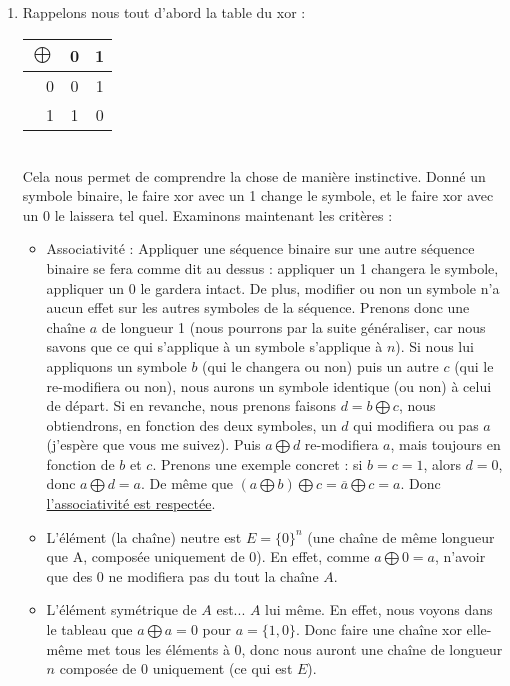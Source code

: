 \documentclass[10p,a4paper]{scrartcl}
\begin{document}
\subsection{}
\begin{enumerate}
	\item	Rappelons nous tout d'abord la table du xor :
			\begin{tabular}{r|cc}
				$\bigoplus$ & 0 & 1\\
				\hline
				0 & 0 & 1\\
				1 & 1 & 0
			\end{tabular}\\
			Cela nous permet de comprendre la chose de manière instinctive. Donné un symbole binaire, le faire xor avec un 1 change le symbole, et le faire xor avec un 0 le laissera tel quel.
			Examinons maintenant les critères :
			\begin{itemize}
				\item 	Associativité : Appliquer une séquence binaire sur une autre séquence binaire se fera comme dit au dessus : appliquer un 1 changera le symbole, appliquer un 0 le gardera intact. De plus, modifier ou non un symbole n'a aucun effet sur les autres symboles de la séquence. Prenons donc une chaîne $a$ de longueur 1 (nous pourrons par la suite généraliser, car nous savons que ce qui s'applique à un symbole s'applique à $n$). Si nous lui appliquons un symbole $b$ (qui le changera ou non) puis un autre $c$ (qui le re-modifiera ou non), nous aurons un symbole identique (ou non) à celui de départ. Si en revanche, nous prenons faisons $d = b\bigoplus c$, nous obtiendrons, en fonction des deux symboles, un $d$ qui modifiera ou pas $a$ (j'espère que vous me suivez). Puis $a \bigoplus d$ re-modifiera $a$, mais toujours en fonction de $b$ et $c$. Prenons une exemple concret : si $b = c = 1$, alors $d = 0$, donc $a \bigoplus d = a$. De même que $(a \bigoplus b) \bigoplus c = \overline{a} \bigoplus c = a$. Donc \uline{l'associativité est respectée}.
				\item 	L'élément (la chaîne) neutre est $E = \{0\}^n$ (une chaîne de même longueur que A, composée uniquement de 0). En effet, comme $a \bigoplus 0 = a$, n'avoir que des 0 ne modifiera pas du tout la chaîne $A$.
				\item 	L'élément symétrique de $A$ est... $A$ lui même. En effet, nous voyons dans le tableau que $a \bigoplus a = 0$ pour $a = \{1,0\}$. Donc faire une chaîne xor elle-même met tous les éléments à 0, donc nous auront une chaîne de longueur $n$ composée de 0 uniquement (ce qui est $E$).

\end{itemize}
\end{enumerate}
\end{document}
